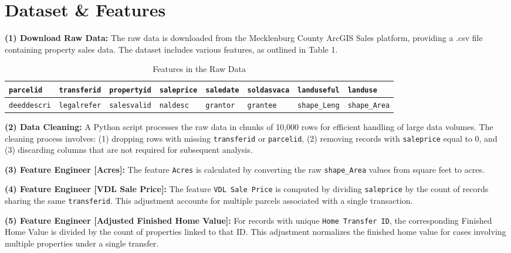 \section{Dataset \& Features}

\textbf{(1) Download Raw Data:} The raw data is downloaded from the Mecklenburg
County ArcGIS Sales platform, providing a .csv file containing property sales
data. The dataset includes various features, as outlined in Table 1.
\begin{table}[h!]
	\centering
	\caption{Features in the Raw Data}
	\renewcommand{\arraystretch}{1} %
	\setlength{\tabcolsep}{8pt} %
	\begin{tabular}{|l|l|l|l|l|l|l|l|}
		\hline
		\texttt{parcelid}   & \texttt{transferid} & \texttt{propertyid} & \texttt{saleprice} & \texttt{saledate} & \texttt{soldasvaca} & \texttt{landuseful}  & \texttt{landuse}     \\
		\hline
		\texttt{deeddescri} & \texttt{legalrefer} & \texttt{salesvalid} & \texttt{naldesc}   & \texttt{grantor}  & \texttt{grantee}    & \texttt{shape\_Leng} & \texttt{shape\_Area} \\
		\hline
	\end{tabular}
\end{table}

\textbf{(2) Data Cleaning:} A Python script processes the raw data in chunks of
10,000 rows for efficient handling of large data volumes. The cleaning process involves:
(1) dropping rows with missing \texttt{transferid} or \texttt{parcelid}, (2) removing
records with \texttt{saleprice} equal to 0, and (3) discarding columns that are not
required for subsequent analysis.

\textbf{(3) Feature Engineer [Acres]:} The feature \texttt{Acres} is calculated by
converting the raw \texttt{shape\_Area} values from square feet to acres.

\textbf{(4) Feature Engineer [VDL Sale Price]:} The feature \texttt{VDL Sale
Price} is computed by dividing \texttt{saleprice} by the count of records sharing
the same \texttt{transferid}. This adjustment accounts for multiple parcels associated
with a single transaction.

\textbf{(5) Feature Engineer [Adjusted Finished Home Value]:} For records with
unique \texttt{Home Transfer ID}, the corresponding Finished Home Value is
divided by the count of properties linked to that ID. This adjustment normalizes
the finished home value for cases involving multiple properties under a single transfer.


